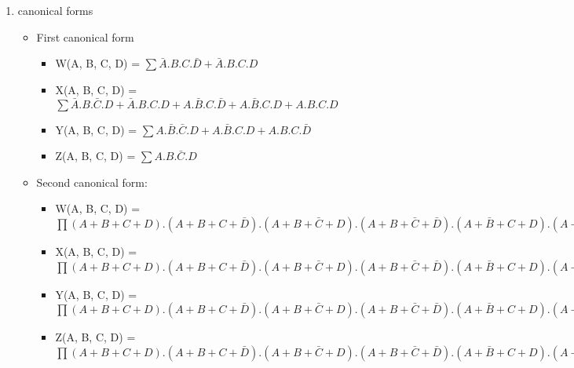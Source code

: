 \begin{enumerate}
\begin{tabular}{|c|c|c|c|c||c|c|c|c|}
        \end{tabular}


        
\item canonical forms 
\begin{itemize}
\item First canonical form 
\begin{itemize}
\item W(A, B, C, D) = $\sum \bar A.B.C.\bar D + \bar A.B.C.D$
\item X(A, B, C, D) = $\sum \bar A.B.\bar C.D + \bar A.B.C.D + A.\bar B.C.\bar D + A.\bar B.C.D + A.B.C.D$
\item Y(A, B, C, D) = $\sum A.\bar B.\bar C.D + A.\bar B.C.D + A.B.C.\bar D$
\item Z(A, B, C, D) = $\sum A.B.\bar C.D$
\end{itemize}
\item Second canonical form: 
\begin{itemize}
\item W(A, B, C, D) = $\prod (A+B+C+D) . (A+B+C+\bar D) . (A+B+\bar C+D) . (A+B+\bar C+\bar D) . (A+\bar B+C+D) . (A+\bar B+C+\bar D) . (\bar A+B+C+D) . (\bar A+B+C+\bar D) . (\bar A+B+\bar C+D) . (\bar A+B+\bar C+\bar D) . (\bar A+\bar B+C+D) . (\bar A+\bar B+C+\bar D) . (\bar A+\bar B+\bar C+D) . (\bar A+\bar B+\bar C+\bar D)$
\item X(A, B, C, D) = $\prod (A+B+C+D) . (A+B+C+\bar D) . (A+B+\bar C+D) . (A+B+\bar C+\bar D) . (A+\bar B+C+D) . (A+\bar B+\bar C+D) . (\bar A+B+C+D) . (\bar A+B+C+\bar D) . (\bar A+\bar B+C+D) . (\bar A+\bar B+C+\bar D) . (\bar A+\bar B+\bar C+D)$
\item Y(A, B, C, D) = $\prod (A+B+C+D) . (A+B+C+\bar D) . (A+B+\bar C+D) . (A+B+\bar C+\bar D) . (A+\bar B+C+D) . (A+\bar B+C+\bar D) . (A+\bar B+\bar C+D) . (A+\bar B+\bar C+\bar D) . (\bar A+B+C+D) . (\bar A+B+\bar C+D) . (\bar A+\bar B+C+D) . (\bar A+\bar B+C+\bar D) . (\bar A+\bar B+\bar C+\bar D)$
\item Z(A, B, C, D) = $\prod (A+B+C+D) . (A+B+C+\bar D) . (A+B+\bar C+D) . (A+B+\bar C+\bar D) . (A+\bar B+C+D) . (A+\bar B+C+\bar D) . (A+\bar B+\bar C+D) . (A+\bar B+\bar C+\bar D) . (\bar A+B+C+D) . (\bar A+B+C+\bar D) . (\bar A+B+\bar C+D) . (\bar A+B+\bar C+\bar D) . (\bar A+\bar B+C+D) . (\bar A+\bar B+\bar C+D) . (\bar A+\bar B+\bar C+\bar D)$
\end{itemize}

\end{itemize}
\end{enumerate}
